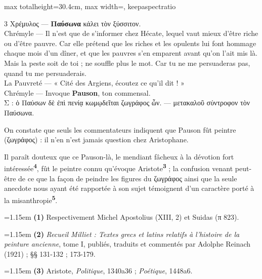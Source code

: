 \documentclass[11pt,twoside]{book}
\newcommand{\italique}[1]{\textit{#1}}
\newcommand{\marqueur}[1]{\textsuperscript{\color{rubricRed}\textbf{#1}}}
\begin{document}
\begin{adjustbox}{max totalheight=30.4cm, max width=\textwidth, keepaspectratio}
\begin{minipage}{\textwidth}
{\begin{multicols}{3}
{Χρέμυλος --- \textbf{Παύσωνα} κάλει τὸν ξύσσιτον.\\
Chrémyle --- Il n'est que de s'informer chez Hécate, lequel vaut mieux d'être riche ou d'être pauvre. Car elle prétend que les riches et les opulents lui font hommage chaque mois d'un dîner, et que les pauvres s'en emparent avant qu'on l'ait mis là. Mais la peste soit de toi ; ne souffle plus le mot. Car tu ne me persuaderas pas, quand tu me persuaderais.\\
La Pauvreté --- « Cité des Argiens, écoutez ce qu'il dit ! »\\
Chrémyle --- Invoque \textbf{Pauson}, ton commensal.\\
Σ : ὁ Παύσων δὲ ἐπὶ πενίᾳ κωμῳδεῖται ζωγράφος ὦν. --- μετακαλοῦ σύντροφον τὸν Παύσωνα.}
\par\vspace{1.5pt}
\noindent On constate que seuls les commentateurs indiquent que Pauson fût peintre (ζωγράφος) : il n'en n'est jamais question chez Aristophane.
\par\vspace{1.5pt}
\noindent Il paraît douteux que ce Pauson-là, le mendiant fâcheux à la dévotion fort intéressée\marqueur{4}, fût le peintre connu qu'évoque Aristote\marqueur{3} ; la confusion venant peut-être de ce que la façon de peindre les figures du ζωγράφος ainsi que la seule anecdote nous ayant été rapportée à son sujet témoignent d'un caractère porté à la misanthropie\marqueur{5}.
\par\vspace{1.5pt}
\par\vspace{1.2pt}\par\nopagebreak\vspace{1pt}\noindent\hangindent=1.15em {\color{sepiaNote}\textbf{(1)}} Respectivement Michel Apostolius (XIII, 2) et Suidas (π 823).
\par\vspace{1.5pt}
\noindent\hangindent=1.15em {\color{sepiaNote}\textbf{(2)}} \italique{Recueil Milliet : Textes grecs et latins relatifs à l'histoire de la peinture ancienne}, tome I, publiés, traduits et commentés par Adolphe Reinach (1921) ; §§ 131-132 ; 173-179.
\par\vspace{1.5pt}
\noindent\hangindent=1.15em {\color{sepiaNote}\textbf{(3)}} Aristote, \italique{Politique}, 1340a36 ; \italique{Poétique}, 1448a6.

\end{multicols}}
\end{minipage}
\end{adjustbox}
\end{document}
